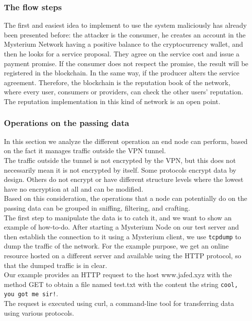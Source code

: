 \documentclass[12pt]{article}
\begin{document}
	\subsubsection{The flow steps}
	The first and easiest idea to implement to use the system maliciously has already been presented before: the attacker is the consumer, he creates an account in the Mysterium Network having a positive balance to the cryptocurrency wallet, and then he looks for a service proposal. They agree on the service cost and issue a payment promise. If the consumer does not respect the promise, the result will be registered in the blockchain. In the same way, if the producer alters the service agreement. Therefore, the blockchain is the reputation book of the network, where every user, consumers or providers, can check the other users' reputation. The reputation implementation in this kind of network is an open point.
	
	\subsubsection{Operations on the passing data}

	In this section we analyze the different operation an end node can perform, based on the fact it manages traffic outside the VPN tunnel.\\
	The traffic outside the tunnel is not encrypted by the VPN, but this does not necessarily mean it is not encrypted by itself. Some protocols encrypt data by design. Others do not encrypt or have different structure levels where the lowest have no encryption at all and can be modified.\\ Based on this consideration, the operations that a node can potentially do on the passing data can be grouped in sniffing, filtering, and crafting.\\
	The first step to manipulate the data is to catch it, and we want to show an example of how-to-do. After starting a Mysterium Node on our test server and then establish the connection to it using a Mysterium client, we use \lstinline{tcpdump} to dump the traffic of the network. For the example purpose, we get an online resource hosted on a different server and available using the HTTP protocol, so that the dumped traffic is in clear.\\
	Our example provides an HTTP request to the host www.jafed.xyz with the method GET to obtain a file named test.txt with the content the string \lstinline{cool, you got me sir!}.\\
	The request is executed using curl, a command-line tool for transferring data using various protocols.\\
\end{document}
